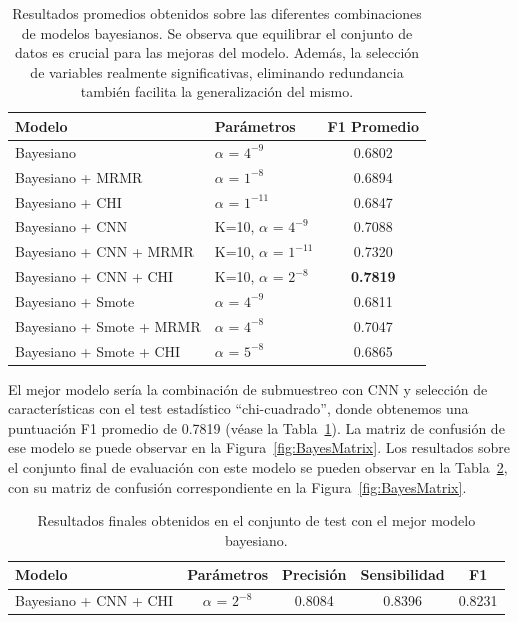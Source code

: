 \documentclass[12pt,letterpaper]{article}
\begin{document}
\begin{table}[htp]
    \centering
    \begin{tabular}{llc}
        \hline
        \textbf{Modelo} & \textbf{Parámetros} &\textbf{F1 Promedio} \\\hline
        Bayesiano & $\alpha$ = $4^{-9}$ & 0.6802 \\ 
        Bayesiano + MRMR & $\alpha$ = $1^{-8}$ & 0.6894 \\ 
        Bayesiano + CHI & $\alpha$ = $1^{-11}$ & 0.6847 \\ 
        Bayesiano + CNN & K=10, $\alpha$ = $4^{-9}$ & 0.7088\\ 
        Bayesiano + CNN + MRMR & K=10, $\alpha$ = $1^{-11}$ & 0.7320 \\ 
        Bayesiano + CNN + CHI & K=10, $\alpha$ = $2^{-8}$ & \textbf{0.7819} \\ 
        Bayesiano + Smote & $\alpha$ = $4^{-9}$ & 0.6811 \\ 
        Bayesiano + Smote + MRMR & $\alpha$ = $4^{-8}$ & 0.7047 \\ 
        Bayesiano + Smote + CHI & $\alpha$ = $5^{-8}$ & 0.6865 \\ 
        \hline
    \end{tabular}
    \caption{Resultados promedios obtenidos sobre las diferentes combinaciones de modelos bayesianos. Se observa que equilibrar el conjunto de datos es crucial para las mejoras del modelo. Además, la selección de variables realmente significativas, eliminando redundancia también facilita la generalización del mismo. }
    \label{tab:BayesResults}
\end{table}
El mejor modelo sería la combinación de submuestreo con CNN y selección de características con el test estadístico ``chi-cuadrado'', donde obtenemos una puntuación F1 promedio de 0.7819 (véase la Tabla~\ref{tab:BayesResults}).
La matriz de confusión de ese modelo se puede observar en la Figura~\ref{fig:BayesMatrix}. Los resultados sobre el conjunto final de evaluación con este modelo se pueden observar en la Tabla~\ref{tab:BayesFinalResults}, con su matriz de confusión correspondiente en la Figura~\ref{fig:BayesMatrix}.


\begin{table}[htp]
    \centering
    \begin{tabular}{lcccc}
        \hline
        \textbf{Modelo} & \textbf{Parámetros} &\textbf{Precisión} &\textbf{Sensibilidad} &\textbf{F1} \\\hline
        Bayesiano + CNN + CHI & $\alpha$ = $2^{-8}$ & 0.8084 & 0.8396 & 0.8231\\ 
        \hline
    \end{tabular}
    \caption{Resultados finales obtenidos en el conjunto de test con el mejor modelo bayesiano.}
    \label{tab:BayesFinalResults}
\end{table}
\end{document}
